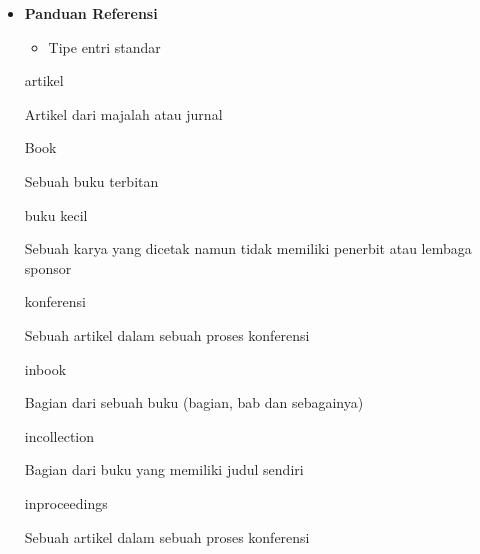 \begin{itemize}
\vspace{12pt}
	\item {\fontsize{14pt}{14pt}\selectfont \textbf{Panduan Referensi}}\par

\begin{itemize}
	\item Tipe entri standar
\end{itemize}\par


artikel\par




Artikel dari majalah atau jurnal\par




Book\par




Sebuah buku terbitan\par




buku kecil\par




Sebuah karya yang dicetak namun tidak memiliki penerbit atau lembaga sponsor\par




konferensi\par




Sebuah artikel dalam sebuah proses konferensi\par




inbook\par




Bagian dari sebuah buku (bagian, bab dan sebagainya)\par




incollection\par




Bagian dari buku yang memiliki judul sendiri\par




inproceedings\par




Sebuah artikel dalam sebuah proses konferensi\par





\end{itemize}
